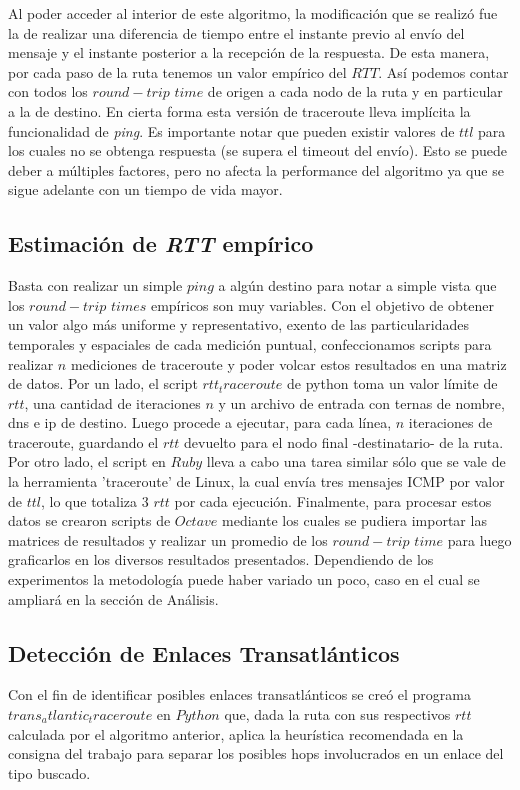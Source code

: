 \indent Al poder acceder al interior de este algoritmo, la modificación que se realizó fue la de realizar una diferencia de tiempo entre el instante previo al envío del mensaje y el instante posterior a la recepción de la respuesta. De esta manera, por cada paso de la ruta tenemos un valor empírico del $RTT$. Así podemos contar con todos los $round-trip$ $time$ de origen a cada nodo de la ruta y en particular a la de destino. En cierta forma esta versión de traceroute lleva implícita la funcionalidad de \textsl{ping}. Es importante notar que pueden existir valores de $ttl$ para los cuales no se obtenga respuesta (se supera el timeout del envío). Esto se puede deber a múltiples factores, pero no afecta la performance del algoritmo ya que se sigue adelante con un tiempo de vida mayor.\\

\subsection{Estimación de \textsl{RTT} empírico}

Basta con realizar un simple $ping$ a algún destino para notar a simple vista que los $round-trip$ $times$ empíricos son muy variables. Con el objetivo de obtener un valor algo más uniforme y representativo, exento de las particularidades temporales y espaciales de cada medición puntual, confeccionamos scripts para realizar $n$ mediciones de traceroute y poder volcar estos resultados en una matriz de datos. Por un lado, el script $rtt_traceroute$ de python toma un valor límite de $rtt$, una cantidad de iteraciones $n$ y un archivo de entrada con ternas de nombre, dns e ip de destino. Luego procede a ejecutar, para cada línea, $n$ iteraciones de traceroute, guardando el $rtt$ devuelto para el nodo final -destinatario- de la ruta. Por otro lado, el script en $Ruby$ lleva a cabo una tarea similar sólo que se vale de la herramienta 'traceroute' de Linux, la cual envía tres mensajes ICMP por valor de $ttl$, lo que totaliza 3 $rtt$ por cada ejecución. Finalmente, para procesar estos datos se crearon scripts de $Octave$ mediante los cuales se pudiera importar las matrices de resultados y realizar un promedio de los $round-trip$ $time$ para luego graficarlos en los diversos resultados presentados. Dependiendo de los experimentos la metodología puede haber variado un poco, caso en el cual se ampliará en la sección de Análisis.

\subsection{Detección de Enlaces Transatlánticos}

Con el fin de identificar posibles enlaces transatlánticos se creó el programa $trans_atlantic_traceroute$ en $Python$ que, dada la ruta con sus respectivos $rtt$ calculada por el algoritmo anterior, aplica la heurística recomendada en la consigna del trabajo para separar los posibles hops involucrados en un enlace del tipo buscado.

